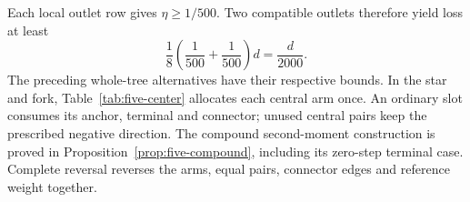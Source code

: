 Each local outlet row gives $\eta\ge1/500$. Two compatible outlets
therefore yield loss at least
\[
 \frac18\left(\frac1{500}+\frac1{500}\right)d=\frac d{2000}.
\]
The preceding whole-tree alternatives have their respective bounds.
In the star and fork, Table~\ref{tab:five-center} allocates each
central arm once. An ordinary slot consumes its anchor, terminal and
connector; unused central pairs keep the prescribed negative
direction. The compound second-moment construction is proved in
Proposition~\ref{prop:five-compound}, including its zero-step terminal
case. Complete reversal reverses the arms, equal pairs, connector
edges and reference weight together.
